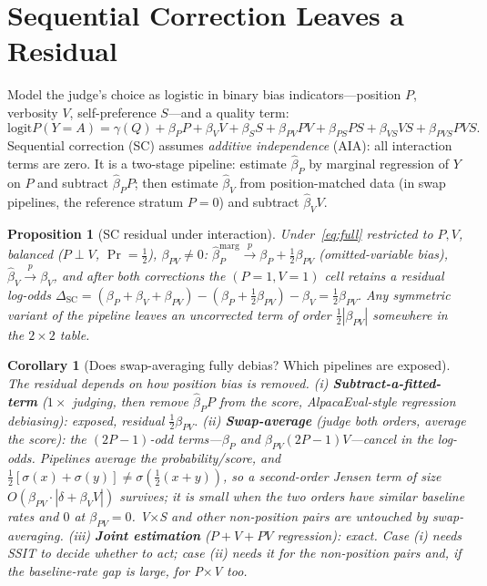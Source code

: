 \documentclass{article}
\newtheorem{proposition}{Proposition}
\newtheorem{corollary}{Corollary}
\newcommand{\logit}{\mathrm{logit}}
\begin{document}
\section{Sequential Correction Leaves a Residual}
\label{sec:theory}

Model the judge's choice as logistic in binary bias
indicators---position $P$, verbosity $V$, self-preference $S$---and
a quality term:
\begin{equation}
  \logit P(Y{=}A) = \gamma(Q) + \beta_P P + \beta_V V + \beta_S S
  + \beta_{PV}PV + \beta_{PS}PS + \beta_{VS}VS + \beta_{PVS}PVS .
  \label{eq:full}
\end{equation}
Sequential correction (SC) assumes \emph{additive independence}
(AIA): all interaction terms are zero. It is a two-stage pipeline:
estimate $\hat\beta_P$ by marginal regression of $Y$ on $P$ and
subtract $\hat\beta_P P$; then estimate $\hat\beta_V$ from
position-matched data (in swap pipelines, the reference stratum
$P{=}0$) and subtract $\hat\beta_V V$.

\begin{proposition}[SC residual under interaction]
\label{prop:residual}
Under~\eqref{eq:full} restricted to $P,V$, balanced
($P{\perp}V$, $\Pr{=}\tfrac12$), $\beta_{PV}\neq0$:
$\hat\beta_P^{\mathrm{marg}}\xrightarrow{p}\beta_P+\tfrac12\beta_{PV}$
(omitted-variable bias), $\hat\beta_V\xrightarrow{p}\beta_V$, and
after both corrections the $(P{=}1,V{=}1)$ cell retains a residual
log-odds
$\Delta_{\mathrm{SC}}=(\beta_P{+}\beta_V{+}\beta_{PV})
-(\beta_P{+}\tfrac12\beta_{PV})-\beta_V=\tfrac12\beta_{PV}$.
Any symmetric variant of the pipeline leaves an uncorrected term of
order $\tfrac12|\beta_{PV}|$ somewhere in the $2{\times}2$ table.
\end{proposition}

\begin{corollary}[Does swap-averaging fully debias? Which pipelines are exposed]
\label{cor:composite}
The residual depends on \emph{how} position bias is removed.
(i) \textbf{Subtract-a-fitted-term} ($1\times$ judging, then remove
$\hat\beta_P P$ from the score, AlpacaEval-style regression
debiasing): exposed, residual $\tfrac12\beta_{PV}$.
(ii) \textbf{Swap-average} (judge both orders, average the score):
the $(2P{-}1)$-odd terms---$\beta_P$ \emph{and}
$\beta_{PV}(2P{-}1)V$---cancel \emph{in the log-odds}. Pipelines
average the probability/score, and
$\tfrac12[\sigma(x){+}\sigma(y)]\neq\sigma(\tfrac12(x{+}y))$, so a
second-order Jensen term of size $O(\beta_{PV}\cdot|\delta{+}\beta_V V|)$
survives; it is small when the two orders have similar baseline
rates and $0$ at $\beta_{PV}{=}0$. V$\times$S and other non-position
pairs are untouched by swap-averaging.
(iii) \textbf{Joint estimation} ($P{+}V{+}PV$ regression): exact.
Case (i) needs SSIT to decide whether to act; case (ii) needs it for
the non-position pairs and, if the baseline-rate gap is large, for
P$\times$V too.
\end{corollary}
\end{document}
